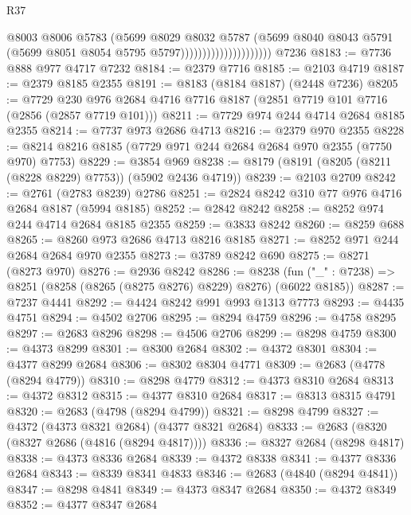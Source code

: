 \begin{lexlean}{R37}
\begin{coremodule}
                                        @8003
                                        @8006
                                        @5783
                                        (@5699
                                          @8029
                                          @8032
                                          @5787
                                          (@5699
                                            @8040
                                            @8043
                                            @5791
                                            (@5699 @8051 @8054 @5795 @5797)))))))))))))))))))))
    @7236
@8183 := @7736 @888 @977 @4717 @7232
@8184 := @2379 @7716
@8185 := @2103 @4719
@8187 := @2379 @8185 @2355
@8191 := @8183 (@8184 @8187) (@2448 @7236)
@8205 := @7729 @230 @976 @2684 @4716 @7716 @8187 (@2851 @7719 @101 @7716 (@2856 (@2857 @7719 @101)))
@8211 := @7729 @974 @244 @4714 @2684 @8185 @2355
@8214 := @7737 @973 @2686 @4713
@8216 := @2379 @970 @2355
@8228 := @8214 @8216 @8185 (@7729 @971 @244 @2684 @2684 @970 @2355 (@7750 @970) @7753)
@8229 := @3854 @969
@8238 := @8179 (@8191 (@8205 (@8211 (@8228 @8229) @7753)) (@5902 @2436 @4719))
@8239 := @2103 @2709
@8242 := @2761 (@2783 @8239) @2786
@8251 := @2824 @8242 @310 @77 @976 @4716 @2684 @8187 (@5994 @8185)
@8252 := @2842 @8242
@8258 := @8252 @974 @244 @4714 @2684 @8185 @2355
@8259 := @3833 @8242
@8260 := @8259 @688
@8265 := @8260 @973 @2686 @4713 @8216 @8185
@8271 := @8252 @971 @244 @2684 @2684 @970 @2355
@8273 := @3789 @8242 @690
@8275 := @8271 (@8273 @970)
@8276 := @2936 @8242
@8286 := @8238 (fun ("_" : @7238) => @8251 (@8258 (@8265 (@8275 @8276) @8229) @8276) (@6022 @8185))
@8287 := @7237 @4441
@8292 := @4424 @8242 @991 @993 @1313 @7773
@8293 := @4435 @4751
@8294 := @4502 @2706
@8295 := @8294 @4759
@8296 := @4758 @8295
@8297 := @2683 @8296
@8298 := @4506 @2706
@8299 := @8298 @4759
@8300 := @4373 @8299
@8301 := @8300 @2684
@8302 := @4372 @8301
@8304 := @4377 @8299 @2684
@8306 := @8302 @8304 @4771
@8309 := @2683 (@4778 (@8294 @4779))
@8310 := @8298 @4779
@8312 := @4373 @8310 @2684
@8313 := @4372 @8312
@8315 := @4377 @8310 @2684
@8317 := @8313 @8315 @4791
@8320 := @2683 (@4798 (@8294 @4799))
@8321 := @8298 @4799
@8327 := @4372 (@4373 @8321 @2684) (@4377 @8321 @2684)
@8333 := @2683 (@8320 (@8327 @2686 (@4816 (@8294 @4817))))
@8336 := @8327 @2684 (@8298 @4817)
@8338 := @4373 @8336 @2684
@8339 := @4372 @8338
@8341 := @4377 @8336 @2684
@8343 := @8339 @8341 @4833
@8346 := @2683 (@4840 (@8294 @4841))
@8347 := @8298 @4841
@8349 := @4373 @8347 @2684
@8350 := @4372 @8349
@8352 := @4377 @8347 @2684

\end{coremodule}
\end{lexlean}
